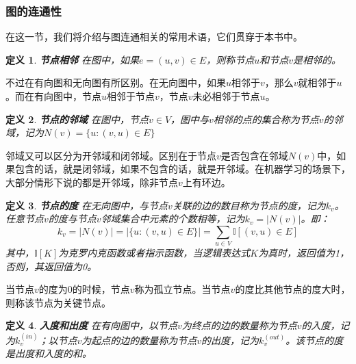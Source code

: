 \documentclass{ctexart}
\newtheorem{Definition}{\hspace{2em}定义}[section]
\begin{document}
            \subsubsection{图的连通性}
                在这一节，我们将介绍与图连通相关的常用术语，它们贯穿于本书中。
                \begin{Definition}
                    \textbf{节点相邻} 在图中，如果$e=(u,v)\in E$，则称节点$u$和节点$v$是相邻的。
                \end{Definition}
                不过在有向图和无向图有所区别。在无向图中，如果$u$相邻于$v$，那么$v$就相邻于$u$。而在有向图中，节点$u$相邻于节点$v$，节点$v$未必相邻于节点$u$。

                \begin{Definition}
                    \textbf{节点的邻域} 在图中，节点$v\in V$，图中与$v$相邻的点的集合称为节点$v$的邻域，记为$N(v)=\{u:(v,u)\in E\}$
                \end{Definition}
                邻域又可以区分为开邻域和闭邻域。区别在于节点$v$是否包含在邻域$N(v)$中，如果包含的话，就是闭邻域，如果不包含的话，就是开邻域。在机器学习的场景下，大部分情形下说的都是开邻域，除非节点$v$上有环边。

                \begin{Definition}
                    \textbf{节点的度} 在无向图中，与节点$v$关联的边的数目称为节点的度，记为$k_v$。任意节点$v$的度与节点$v$邻域集合中元素的个数相等，记为$k_v=|N(v)|$。即：
                    \begin{equation}
                        k_v = |N(v)| = |\{u:(v,u)\in E\}| = \sum_{u\in V} \mathbb{I}[(v,u)\in E]
                    \end{equation}
                    其中，$\mathbb{I}[K]$为克罗内克函数或者指示函数，当逻辑表达式$K$为真时，返回值为1，否则，其返回值为0。
                \end{Definition}
                当节点$v$的度为0的时候，节点$v$称为孤立节点。当节点$v$的度比其他节点的度大时，则称该节点为关键节点。

                \begin{Definition}
                    \textbf{入度和出度} 在有向图中，以节点$v$为终点的边的数量称为节点$v$的入度，记为$k_v^{(in)}$；以节点$v$为起点的边的数量称为节点$v$的出度，记为$k_v^{(out)}$。该节点的度是出度和入度的和。
                \end{Definition}
\end{document}
